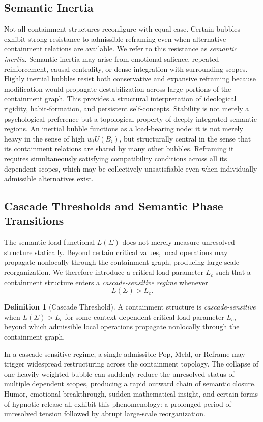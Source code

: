 \documentclass[12pt, a4paper]{article}
\theoremstyle{plain}
\theoremstyle{definition}
\newtheorem{definition}[theorem]{Definition}
\theoremstyle{remark}
\begin{document}
\subsection{Semantic Inertia}

Not all containment structures reconfigure with equal ease. Certain bubbles
exhibit strong resistance to admissible reframing even when alternative
containment relations are available. We refer to this resistance as
\emph{semantic inertia}. Semantic inertia may arise from emotional salience,
repeated reinforcement, causal centrality, or dense integration with
surrounding scopes. Highly inertial bubbles resist both conservative and
expansive reframing because modification would propagate destabilization across
large portions of the containment graph. This provides a structural
interpretation of ideological rigidity, habit-formation, and persistent
self-concepts. Stability is not merely a psychological preference but a
topological property of deeply integrated semantic regions. An inertial bubble
functions as a load-bearing node: it is not merely heavy in the sense of high
$w_i U(B_i)$, but structurally central in the sense that its containment
relations are shared by many other bubbles. Reframing it requires
simultaneously satisfying compatibility conditions across all its dependent
scopes, which may be collectively unsatisfiable even when individually
admissible alternatives exist.

\subsection{Cascade Thresholds and Semantic Phase Transitions}

The semantic load functional $L(\Sigma)$ does not merely measure unresolved
structure statically. Beyond certain critical values, local operations may
propagate nonlocally through the containment graph, producing large-scale
reorganization. We therefore introduce a critical load parameter $L_c$ such
that a containment structure enters a \emph{cascade-sensitive regime} whenever
\[
  L(\Sigma) > L_c.
\]

\begin{definition}[Cascade Threshold]
A containment structure is \emph{cascade-sensitive} when $L(\Sigma) > L_c$
for some context-dependent critical load parameter $L_c$, beyond which
admissible local operations propagate nonlocally through the containment
graph.
\end{definition}

In a cascade-sensitive regime, a single admissible Pop, Meld, or Reframe may
trigger widespread restructuring across the containment topology. The collapse
of one heavily weighted bubble can suddenly reduce the unresolved status of
multiple dependent scopes, producing a rapid outward chain of semantic
closure. Humor, emotional breakthrough, sudden mathematical insight, and
certain forms of hypnotic release all exhibit this phenomenology: a prolonged
period of unresolved tension followed by abrupt large-scale reorganization.
\end{document}
